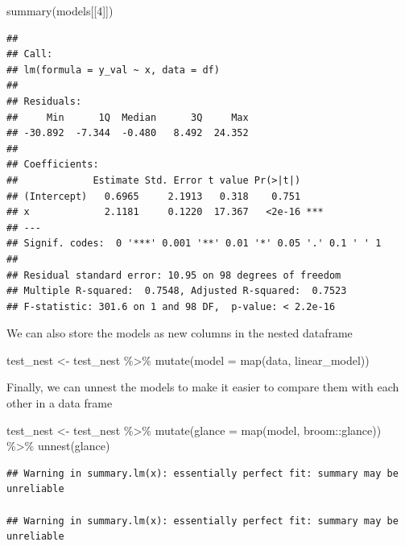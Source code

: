 \documentclass[
]{book}
\newenvironment{Shaded}{\begin{snugshade}}{\end{snugshade}}
\newcommand{\AttributeTok}[1]{\textcolor[rgb]{0.77,0.63,0.00}{#1}}
\newcommand{\DecValTok}[1]{\textcolor[rgb]{0.00,0.00,0.81}{#1}}
\newcommand{\FunctionTok}[1]{\textcolor[rgb]{0.00,0.00,0.00}{#1}}
\newcommand{\NormalTok}[1]{#1}
\newcommand{\OtherTok}[1]{\textcolor[rgb]{0.56,0.35,0.01}{#1}}
\newcommand{\SpecialCharTok}[1]{\textcolor[rgb]{0.00,0.00,0.00}{#1}}
\begin{document}
\begin{Shaded}
\begin{Highlighting}[]
\FunctionTok{summary}\NormalTok{(models[[}\DecValTok{4}\NormalTok{]])}
\end{Highlighting}
\end{Shaded}

\begin{verbatim}
## 
## Call:
## lm(formula = y_val ~ x, data = df)
## 
## Residuals:
##     Min      1Q  Median      3Q     Max 
## -30.892  -7.344  -0.480   8.492  24.352 
## 
## Coefficients:
##             Estimate Std. Error t value Pr(>|t|)    
## (Intercept)   0.6965     2.1913   0.318    0.751    
## x             2.1181     0.1220  17.367   <2e-16 ***
## ---
## Signif. codes:  0 '***' 0.001 '**' 0.01 '*' 0.05 '.' 0.1 ' ' 1
## 
## Residual standard error: 10.95 on 98 degrees of freedom
## Multiple R-squared:  0.7548, Adjusted R-squared:  0.7523 
## F-statistic: 301.6 on 1 and 98 DF,  p-value: < 2.2e-16
\end{verbatim}

We can also store the models as new columns in the nested dataframe

\begin{Shaded}
\begin{Highlighting}[]
\NormalTok{test\_nest }\OtherTok{\textless{}{-}}\NormalTok{ test\_nest }\SpecialCharTok{\%\textgreater{}\%} 
  \FunctionTok{mutate}\NormalTok{(}\AttributeTok{model =} \FunctionTok{map}\NormalTok{(data, linear\_model))}
\end{Highlighting}
\end{Shaded}

Finally, we can unnest the models to make it easier to compare them with each other in a data frame

\begin{Shaded}
\begin{Highlighting}[]
\NormalTok{test\_nest }\OtherTok{\textless{}{-}}\NormalTok{ test\_nest }\SpecialCharTok{\%\textgreater{}\%} 
  \FunctionTok{mutate}\NormalTok{(}\AttributeTok{glance =} \FunctionTok{map}\NormalTok{(model, broom}\SpecialCharTok{::}\NormalTok{glance)) }\SpecialCharTok{\%\textgreater{}\%} 
  \FunctionTok{unnest}\NormalTok{(glance)}
\end{Highlighting}
\end{Shaded}

\begin{verbatim}
## Warning in summary.lm(x): essentially perfect fit: summary may be unreliable

## Warning in summary.lm(x): essentially perfect fit: summary may be unreliable
\end{verbatim}
\end{document}
